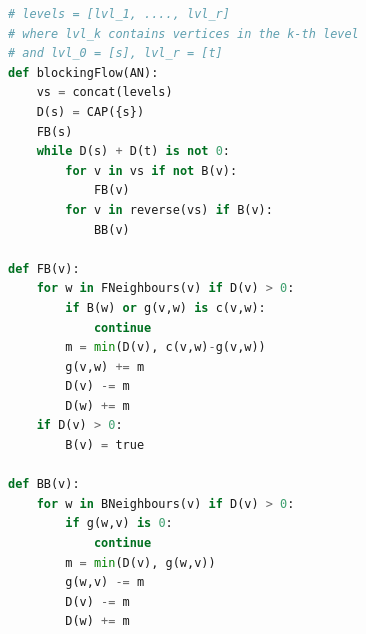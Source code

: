 \begin{lstlisting}[language=Python]
# levels = [lvl_1, ...., lvl_r]
# where lvl_k contains vertices in the k-th level
# and lvl_0 = [s], lvl_r = [t]
def blockingFlow(AN):
    vs = concat(levels)
    D(s) = CAP({s})
    FB(s)
    while D(s) + D(t) is not 0:
        for v in vs if not B(v):
            FB(v)
        for v in reverse(vs) if B(v):
            BB(v)

def FB(v):
    for w in FNeighbours(v) if D(v) > 0:
        if B(w) or g(v,w) is c(v,w):
            continue
        m = min(D(v), c(v,w)-g(v,w))
        g(v,w) += m
        D(v) -= m
        D(w) += m
    if D(v) > 0:
        B(v) = true
        
def BB(v):
    for w in BNeighbours(v) if D(v) > 0:
        if g(w,v) is 0:
            continue
        m = min(D(v), g(w,v))
        g(w,v) -= m
        D(v) -= m
        D(w) += m
\end{lstlisting}
